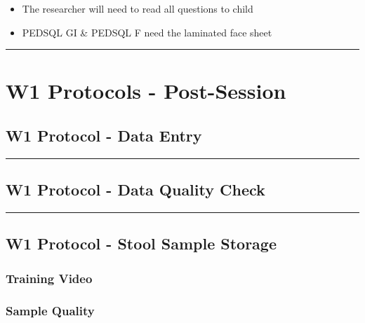 \documentclass[
]{book}
\providecommand{\tightlist}{%
  \setlength{\itemsep}{0pt}\setlength{\parskip}{0pt}}
\begin{document}
\begin{itemize}
\tightlist
\item
  The researcher will need to read all questions to child
\item
  PEDSQL GI \& PEDSQL F need the laminated face sheet
\end{itemize}

\begin{center}\rule{0.5\linewidth}{0.5pt}\end{center}

\hypertarget{w1-protocols---post-session}{%
\section{W1 Protocols - Post-Session}\label{w1-protocols---post-session}}

\hypertarget{w1-protocol---data-entry}{%
\subsection{W1 Protocol - Data Entry}\label{w1-protocol---data-entry}}

\begin{center}\rule{0.5\linewidth}{0.5pt}\end{center}

\hypertarget{w1-protocol---data-quality-check}{%
\subsection{W1 Protocol - Data Quality Check}\label{w1-protocol---data-quality-check}}

\begin{center}\rule{0.5\linewidth}{0.5pt}\end{center}

\hypertarget{w1-protocol---stool-sample-storage}{%
\subsection{W1 Protocol - Stool Sample Storage}\label{w1-protocol---stool-sample-storage}}

\hypertarget{training-video-1}{%
\subsubsection{Training Video}\label{training-video-1}}

\hypertarget{sample-quality}{%
\subsubsection{Sample Quality}\label{sample-quality}}
\end{document}
